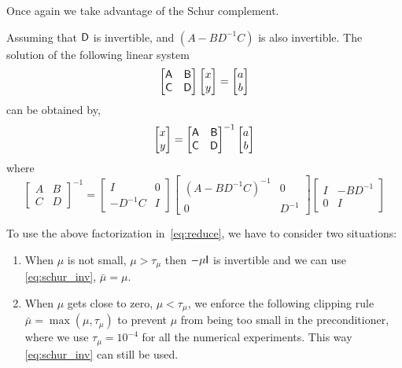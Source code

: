 Once again we take advantage of the Schur complement. 
\begin{remark}
Assuming that $\mathsf{D}$ is invertible, and $\left( A-BD^{-1}C \right) $ is also invertible. 
The solution of the following linear system 
\begin{equation*}
\begin{bmatrix}
\mathsf{A}  & \mathsf{B} \\
\mathsf{C}  & \mathsf{D} 
\end{bmatrix} 
\begin{bmatrix}
x \\ y
\end{bmatrix}
= 
\begin{bmatrix}
a \\ b
\end{bmatrix}
\end{equation*}
can be obtained by, 
\begin{equation*}
\begin{bmatrix}
x \\ y
\end{bmatrix}=
\begin{bmatrix}
\mathsf{A}  & \mathsf{B} \\
\mathsf{C}  & \mathsf{D} 
\end{bmatrix} ^{-1}
\begin{bmatrix}
a \\ b
\end{bmatrix}
\end{equation*}
where 
\begin{equation}\label{eq:schur_inv}
\begin{bmatrix}
A & B \\ C & D 
\end{bmatrix} ^{-1}
= \begin{bmatrix}
I  & 0 \\
-D^{-1}C  & I 
\end{bmatrix}
 \begin{bmatrix}
\left( A-BD^{-1}C \right)^{-1}   &  0 \\
 0   & D^{-1} 
\end{bmatrix}
\begin{bmatrix}
I  &   -BD^{-1} \\
0  &  I 
\end{bmatrix}
\end{equation}
\end{remark}
To use the above factorization in~\eqref{eq:reduce}, we have to consider two situations: 
\begin{enumerate}
\item When $\mu$ is not small, \eg $\mu > \tau_{\mu}$ then $- \mu \mathsf{I}$ is invertible and we can use \eqref{eq:schur_inv}, $\bar{\mu} =  \mu$. 
\item When $\mu$ gets close to zero, \eg $\mu < \tau_{\mu}$, we enforce the following clipping rule 
$ \bar{\mu} = \max(\mu, \tau_\mu) $ 
to prevent $\mu$ from being too small in the preconditioner, where we use $\tau_{\mu} = 10^{-4}$ for all the numerical experiments. This way \eqref{eq:schur_inv} can still be used.
\end{enumerate}
